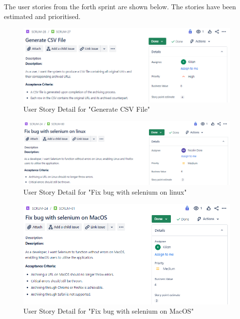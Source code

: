 The user stories from the forth sprint are shown below. The stories have been estimated and prioritised.
\begin{figure}[h!]
    \centering
    \includegraphics[width=1\textwidth]{pictures/Scrum/Sprint 4/UserStory_9}
    \caption{User Story Detail for "Generate CSV File"}
    \label{fig:sprint_4_userstory_1}
\end{figure}
\begin{figure}[h!]
    \centering
    \includegraphics[width=1\textwidth]{pictures/Scrum/Sprint 4/UserStory_16}
    \caption{User Story Detail for "Fix bug with selenium on linux"}
    \label{fig:sprint_4_userstory_2}
\end{figure}
\begin{figure}[h!]
    \centering
    \includegraphics[width=1\textwidth]{pictures/Scrum/Sprint 4/UserStory_17}
    \caption{User Story Detail for "Fix bug with selenium on MacOS"}
    \label{fig:sprint_4_userstory_3}
\end{figure}

